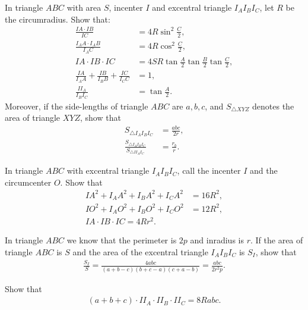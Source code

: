 \documentclass[12pt,a4paper]{memoir}
\theoremstyle{definition}
\begin{document}
\begin{question}[name={Excentral Identities}]
	In triangle $ABC$ with area $S$, incenter $I$ and excentral triangle $I_AI_BI_C$, let $R$ be the circumradius. Show that:
	\begin{align*}
		\frac{IA\cdot IB}{IC} &= 4R\sin^2\frac{C}{2},\\
		\frac{I_AA\cdot I_AB}{I_AC} &= 4R\cos^2\frac{C}{2},\\     IA \cdot IB \cdot IC &= 4SR\tan\frac{A}{2}\tan\frac{B}{2}\tan\frac{C}{2},\\
		\frac{IA}{I_AA}+\frac{IB}{I_BB}+\frac{IC}{I_CC}& = 1,\\
		\frac{II_A}{I_BI_C} &= \tan \frac{A}{2}.
	\end{align*}
	Moreover, if the side-lengths of triangle $ABC$ are $a,b,c$, and $S_{\triangle XYZ}$ denotes the area of triangle $XYZ$, show that
	\begin{align*}
		S_{\triangle I_AI_BI_C} &= \frac{abc}{2r},\\
		\frac{S_{\triangle I_AI_BI_C}}{S_{\triangle II_AI_C}} &= \frac{r_b}{r}.
	\end{align*}
\end{question}

\begin{question}
	In triangle $ABC$ with excentral triangle $I_AI_BI_C$, call the incenter $I$ and the circumcenter $O$. Show that
	\begin{align*}
		IA^2+I_AA^2+I_BA^2+I_CA^2 &= 16R^2,\\
		IO^2+I_AO^2+I_BO^2+I_CO^2 &= 12R^2,\\
		IA \cdot IB \cdot IC = 4Rr^2.
	\end{align*}
\end{question}

\begin{question}
	In triangle $ABC$ we know that the perimeter is $2p$ and inradius is $r$. If the area of triangle $ABC$ is $S$ and the area of the excentral triangle $I_AI_BI_C$ is $S_I$, show that
	\begin{align*}
		\frac{S_I}{S}= \frac{4abc}{(a+b-c)(b+c-a)(c+a-b)} = \frac{abc}{2r^2p}.
	\end{align*}
\end{question}

\begin{question}
	Show that 
	\begin{align*}
		(a+b+c)\cdot II_A \cdot II_B \cdot II_C = 8Rabc.
	\end{align*}
\end{question}
\end{document}
